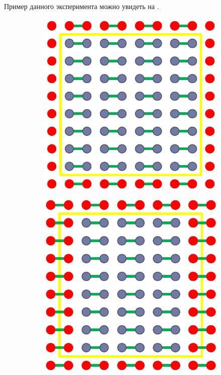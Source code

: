 	Пример данного эксперимента можно увидеть на .
	
	\begin{figure}[ht]
		\hspace*{\fill}
		\begin{subfigure}[t]{\dimexpr.35\linewidth-1.3em\relax}
			\centering
			\includegraphics[width=.65\linewidth,valign=t]{my_folder/images/chunk_structural_1}
		\end{subfigure}
		\begin{subfigure}[t]{\dimexpr.35\linewidth-1.3em\relax}
			\centering
			\includegraphics[width=.65\linewidth,valign=t]{my_folder/images/chunk_structural_2}
		\end{subfigure}
		\hspace*{\fill}
		\\[20pt]	

\end{figure}
